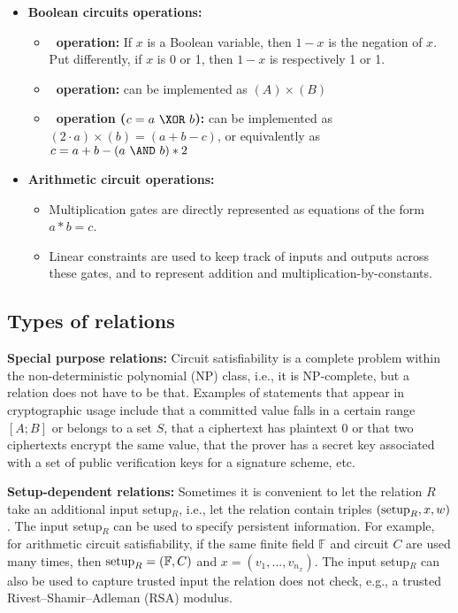 \begin{itemize}

\item \textbf{Boolean circuits operations:}

	\begin{itemize}

	\item \textbf{\NOT\ operation:}
	If $x$ is a Boolean variable, then $1-x$ is the negation of $x$.
	Put differently, if $x$ is 0 or 1, then $1-x$ is respectively 1 or 1.

	\item \textbf{\AND\ operation:} 
		can be implemented as $(A) \times (B)$

	\item \textbf{\XOR\ operation ($c = a~\XOR~b$):}
		can be implemented as $(2 \cdot a ) \times (b) = (a + b - c)$, 
	or equivalently as $c = a + b - (a~\AND~b) \ast 2$
	\end{itemize}


\item \textbf{Arithmetic circuit operations:} 

	\begin{itemize}
	\item Multiplication gates are directly represented as equations of the form $a \ast b = c$.
	\item Linear constraints are used to keep track of inputs and outputs across these gates, 
and to represent addition and multiplication-by-constants.
	\end{itemize}

\end{itemize}


\subsection{Types of relations}
\label{security:spec-statements-ZK:types-of-relations}


 
\textbf{Special purpose relations:} Circuit satisfiability is 
a complete problem within the non-deter\-min\-istic polynomial (NP) class,
i.e., it is NP-complete,
but a relation does not have to be that. 
	Examples of statements that appear in cryptographic usage include that a committed value falls in a certain range $[A;B]$ or belongs to a set $S$, that a ciphertext has plaintext 0 or that two ciphertexts encrypt the same value, that the prover has a secret key associated with a set of public verification keys for a signature scheme, etc.


\textbf{Setup-dependent relations:} 
	Sometimes it is convenient to let the relation $R$ take an additional input setup$_R$, i.e., let the relation contain triples $(\textmd{setup}_R, x, w)$. 
	The input setup$_R$ can be used to specify persistent information.
	For example, for arithmetic circuit satisfiability, if the same finite field $\mathbb{F}$ and circuit $C$ are used many times, 
then $\textmd{setup}_R = (\mathbb{F}, C)$ and $x = (v_1,...,v_{n_x})$.
	The input setup$_R$ can also be used to capture trusted input the relation does not check, 
e.g., a trusted Rivest--Shamir--Adleman (RSA) modulus.

